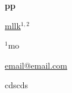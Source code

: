 \documentclass[12pt, twoside, a4paper, hidelinks]{article}
\begin{document}
        \begin{center}  \fontsize{14}{15}\selectfont \textbf{pp} \end{center}
        \vspace{-0.8cm}\begin{center} \fontsize{12}{13}\selectfont \underline{mllk}$^{1,2}$ \end{center}
        \vspace{-.5cm}

        \begin{center} \fontsize{10}{11}\selectfont $^{1}$mo
            
            \underline{email@email.com}
         \end{center}

        \fontsize{10}{11}\selectfont cdscds
        
\end{document}
